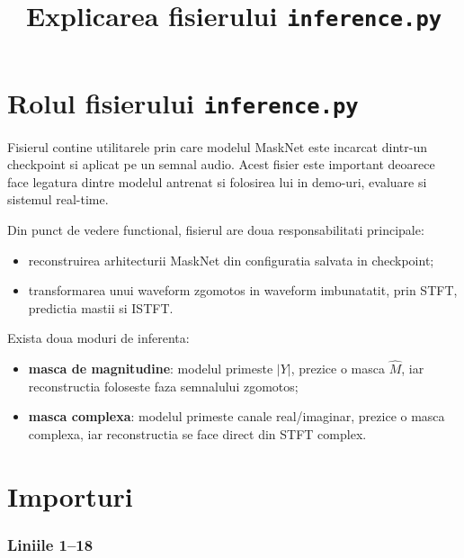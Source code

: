 \documentclass[12pt,a4paper]{report}
\title{Explicarea fisierului \texttt{inference.py}}
\author{}
\date{}
\newcommand{\codechunk}[2]{%
\subsection*{Liniile #1--#2}

}
\begin{document}
\maketitle
\tableofcontents
\clearpage

\chapter{Rolul fisierului \texttt{inference.py}}

Fisierul  contine utilitarele prin care modelul
MaskNet este incarcat dintr-un checkpoint si aplicat pe un semnal audio. Acest
fisier este important deoarece face legatura dintre modelul antrenat si folosirea
lui in demo-uri, evaluare si sistemul real-time.

Din punct de vedere functional, fisierul are doua responsabilitati principale:

\begin{itemize}
    \item reconstruirea arhitecturii MaskNet din configuratia salvata in checkpoint;
    \item transformarea unui waveform zgomotos in waveform imbunatatit, prin STFT,
    predictia mastii si ISTFT.
\end{itemize}

Exista doua moduri de inferenta:

\begin{itemize}
    \item \textbf{masca de magnitudine}: modelul primeste \(|Y|\), prezice o masca
    \(\hat{M}\), iar reconstructia foloseste faza semnalului zgomotos;
    \item \textbf{masca complexa}: modelul primeste canale real/imaginar, prezice
    o masca complexa, iar reconstructia se face direct din STFT complex.
\end{itemize}

\chapter{Importuri}

\codechunk{1}{18}
\end{document}
